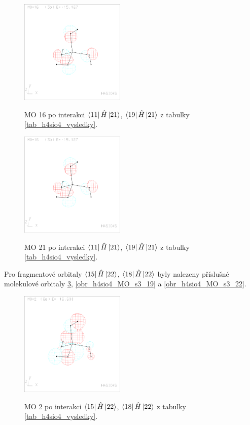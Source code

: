 \documentclass[
  digital, %
  table,   %
  lof,     %
  lot,     %
]{fithesis3}
\begin{document}
\begin{figure}[h]
\caption{MO 16 po interakci $\bra{11}{\hat{H}}\ket{21}$, $\bra{19}{\hat{H}}\ket{21}$ z tabulky \ref{tab_h4sio4_vysledky}.  }
  \center
  \includegraphics[width=5cm]{h4sio4_obrazky/s2_16.eps}
  \label{obr_h4sio4_MO_s2_16}
  \end{figure}

\begin{figure}[h]
\caption{MO 21 po interakci $\bra{11}{\hat{H}}\ket{21}$, $\bra{19}{\hat{H}}\ket{21}$ z tabulky \ref{tab_h4sio4_vysledky}.  }
  \center
  \includegraphics[width=5cm]{h4sio4_obrazky/s2_16.eps}
  \label{obr_h4sio4_MO_s2_21}
  \end{figure}
  
  Pro fragmentové orbitaly $\bra{15}{\hat{H}}\ket{22}$, $\bra{18}{\hat{H}}\ket{22}$ byly nalezeny příslušné molekulové orbitaly \ref{obr_h4sio4_MO_s3_2}, \ref{obr_h4sio4_MO_s3_19} a \ref{obr_h4sio4_MO_s3_22}.
  
  \begin{figure}[h]
\caption{MO 2 po interakci $\bra{15}{\hat{H}}\ket{22}$, $\bra{18}{\hat{H}}\ket{22}$ z tabulky \ref{tab_h4sio4_vysledky}.  }
  \center
  \includegraphics[width=5cm]{h4sio4_obrazky/s3__2.eps}
  \label{obr_h4sio4_MO_s3_2}
  \end{figure}
\end{document}

